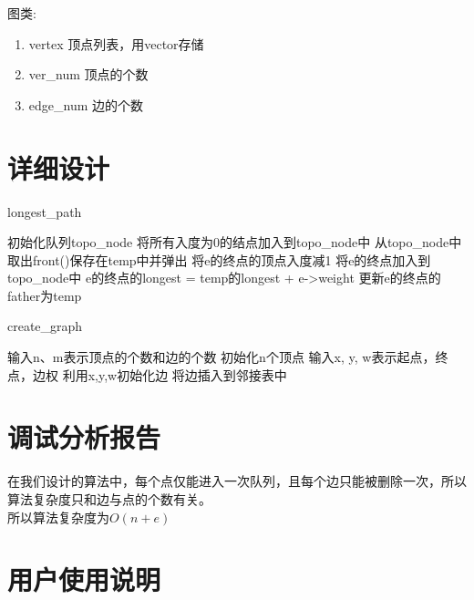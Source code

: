 	图类:
	\begin{enumerate}
		\item vertex 顶点列表，用vector存储
		\item ver\_num 顶点的个数
		\item edge\_num 边的个数
	\end{enumerate}

\section{详细设计}

\begin{algorithm}[htb] 
	\caption{ longest\_path } 
	\label{alg:Framwork} 
	\begin{algorithmic}[1]
		\State 初始化队列topo\_node
		\State 将所有入度为0的结点加入到topo\_node中
			\State 从topo\_node中取出front()保存在temp中并弹出
				\State 将e的终点的顶点入度减1
					\State 将e的终点加入到topo\_node中
				\EndIf
					\State e的终点的longest = temp的longest + e->weight
					\State 更新e的终点的father为temp
				\EndIf
			\EndFor
		\EndWhile
	\end{algorithmic} 
\end{algorithm}

\newpage

\begin{algorithm}[htb] 
	\caption{ create\_graph } 
	\label{alg:Framwork} 
	\begin{algorithmic}[1]
		\State 输入n、m表示顶点的个数和边的个数
		\State 初始化n个顶点
			\State 输入x, y, w表示起点，终点，边权
			\State 利用x,y,w初始化边
			\State 将边插入到邻接表中
		\EndFor
	\end{algorithmic} 
\end{algorithm}
\newpage

\section{调试分析报告}
在我们设计的算法中，每个点仅能进入一次队列，且每个边只能被删除一次，所以算法复杂度只和边与点的个数有关。\\
所以算法复杂度为$O(n + e)$

\section{用户使用说明}

